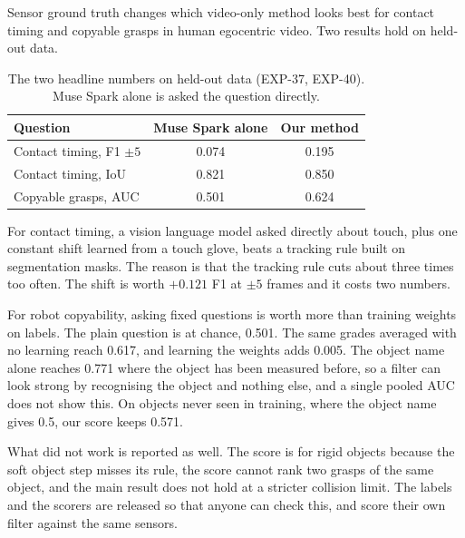 \documentclass[10pt,twocolumn,letterpaper]{article}
\begin{document}
Sensor ground truth changes which video-only method looks best for contact
timing and copyable grasps in human egocentric video. Two results hold on
held-out data.

\begin{table}[h]
\centering
\caption{The two headline numbers on held-out data (EXP-37, EXP-40). Muse
Spark alone is asked the question directly.}
\label{tab:headline}
\small
\begin{tabular}{lcc}
\toprule
Question & Muse Spark alone & Our method \\
\midrule
Contact timing, F1 $\pm 5$ & 0.074 & 0.195 \\
Contact timing, IoU & 0.821 & 0.850 \\
Copyable grasps, AUC & 0.501 & 0.624 \\
\bottomrule
\end{tabular}
\end{table}

For contact timing, a vision language model asked directly about touch, plus
one constant shift learned from a touch glove, beats a tracking rule built on
segmentation masks. The reason is that the tracking rule cuts about three
times too often. The shift is worth $+0.121$ F1 at $\pm 5$ frames and it costs
two numbers.

For robot copyability, asking fixed questions is worth more than training
weights on labels. The plain question is at chance, 0.501. The same grades
averaged with no learning reach 0.617, and learning the weights adds 0.005.
The object name alone reaches 0.771 where the object has been measured before,
so a filter can look strong by recognising the object and nothing else, and a
single pooled AUC does not show this. On objects never seen in training, where
the object name gives 0.5, our score keeps 0.571.

What did not work is reported as well. The score is for rigid objects because
the soft object step misses its rule, the score cannot rank two grasps of the
same object, and the main result does not hold at a stricter collision limit. The labels and the scorers are released
so that anyone can check this, and score their own filter against the same
sensors.
\end{document}
